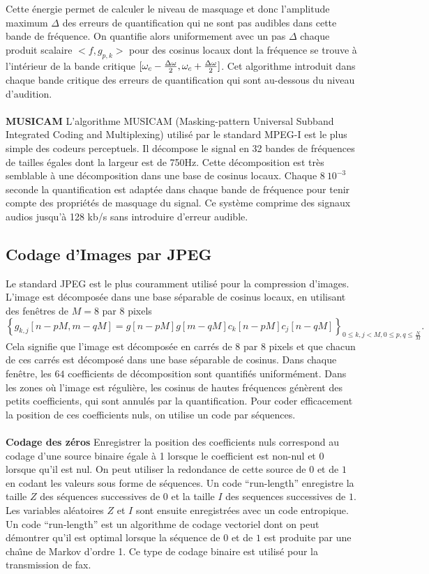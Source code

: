 Cette \'energie permet de calculer le niveau de masquage et 
donc l'amplitude maximum $\Delta$
des erreurs de quantification qui ne sont pas audibles dans
cette bande de fr\'equence. On quantifie alors 
uniformement avec un pas $\Delta$ chaque produit scalaire
$<f , g_{p,k}>$ pour des cosinus locaux
dont la fr\'equence se trouve \`a l'int\'erieur de la bande critique
$[{\omega}_c - \frac{\Delta {\omega}} 2, {\omega}_c + \frac{\Delta {\omega}} 2 ]$.
Cet algorithme introduit dans chaque bande critique des erreurs
de quantification qui sont au-dessous du niveau d'audition.\\
\\
{\bf MUSICAM}
L'algorithme MUSICAM
(Masking-pattern Universal Subband Integrated Coding and
Multiplexing) utilis\'e par le standard MPEG-I est 
le plus simple des
codeurs perceptuels. Il d\'ecompose le signal en 32 bandes de fr\'equences
de tailles \'egales dont la largeur  est de 750Hz.
Cette d\'ecomposition est tr\`es semblable \`a une d\'ecomposition dans
une base de cosinus locaux.
Chaque $8~ 10^{-3}$ seconde
la quantification est adapt\'ee dans chaque bande de 
fr\'equence pour tenir compte des propri\'et\'es de masquage du signal.
Ce syst\`eme comprime des signaux audios jusqu'\`a 128 kb/s sans 
introduire d'erreur audible.

\subsection{Codage d'Images par JPEG}
\label{still-image-comp}

Le standard JPEG est le plus 
couramment utilis\'e pour la compression
d'images.
L'image est d\'ecompos\'ee dans une base s\'eparable de
cosinus locaux, en utilisant des fen\^etres de $M = 8$ par 8 pixels
\[
\left\{ 
g_{k,j} [n - pM ,m - qM] = g[n-pM] g[m-qM] 
c_k [n-pM] c_j [n-qM]
\right\}_{0 \leq k,j < M, 0 \leq p,q \leq \frac N M}.
\]
Cela signifie que l'image est d\'ecompos\'ee en carr\'es de
$8$ par 8 pixels et que chacun de ces carr\'es est d\'ecompos\'e
dans une base s\'eparable de cosinus. Dans chaque fen\^etre,
les $64$ coefficients de d\'ecomposition
sont quantifi\'es uniform\'ement.
Dans les zones
o\`u l'image est r\'eguli\`ere, 
les cosinus de hautes fr\'equences g\'en\`erent des
petits coefficients, qui sont annul\'es par la quantification.
Pour coder efficacement la position de ces coefficients nuls,
on utilise un code par s\'equences.
\\
\\
{\bf Codage des z\'eros}
Enregistrer la position des coefficients nuls correspond au codage
d'une source binaire \'egale \`a 1 lorsque le coefficient est non-nul
et $0$ lorsque qu'il est nul.
On peut utiliser la redondance de cette source de $0$ et de $1$
en codant les valeurs sous forme de s\'equences.
Un code ``run-length'' enregistre la taille
$Z$ des s\'equences successives de $0$ et la taille $I$ des sequences
successives de $1$. Les variables al\'eatoires $Z$ et $I$ 
sont ensuite
enregistr\'ees avec un code entropique.
Un code ``run-length'' est un algorithme de codage vectoriel 
dont on peut d\'emontrer qu'il est optimal lorsque la s\'equence
de $0$ et de $1$ est produite par une cha\^{\i}ne de Markov d'ordre 1.
Ce type de codage binaire est utilis\'e pour la transmission de
fax.

